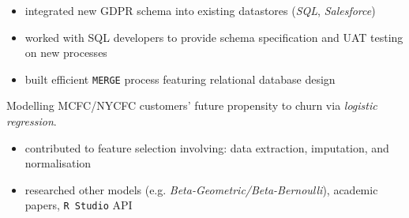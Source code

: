 \documentclass[letterpaper,11pt]{article}
\begin{document}
\begin{description}[style=multiline,leftmargin=3cm]
\begin{itemize}
		      \item integrated new GDPR schema into existing datastores (\textit{SQL}, \textit{Salesforce})
		      \item worked with SQL developers to provide schema specification and UAT testing on new processes
		      \item built efficient \texttt{MERGE} process featuring relational database design
	      \end{itemize}
	\item[Customer Churn Model]
	      Modelling MCFC/NYCFC customers' future propensity to churn via \textit{logistic regression}.
	      \begin{itemize}
		      \item contributed to feature selection involving: data extraction, imputation, and normalisation
		      \item researched other models (e.g. \textit{Beta-Geometric/Beta-Bernoulli}), academic papers, \texttt{R Studio} API
	      \end{itemize}
\end{description}
\end{document}
